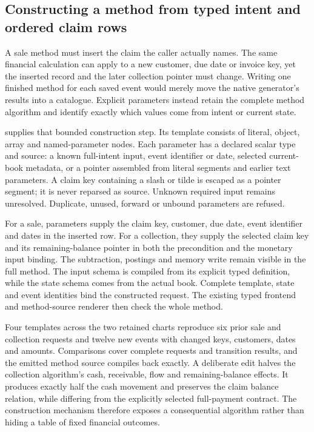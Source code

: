 \subsection{Constructing a method from typed intent and ordered claim rows}
\label{sec:method-specialization}

A sale method must insert the claim the caller actually names. The same
financial calculation can apply to a new customer, due date or invoice key,
yet the inserted record and the later collection pointer must change. Writing
one finished method for each saved event would merely move the native
generator's results into a catalogue. Explicit parameters instead retain the
complete method algorithm and identify exactly which values come from intent
or current state.

 supplies that bounded construction step.
Its template consists of literal, object, array and named-parameter nodes.
Each parameter has a declared scalar type and source: a known full-intent input,
event identifier or date, selected current-book metadata, or a pointer assembled
from literal segments and earlier text parameters. A claim key containing a
slash or tilde is escaped as a pointer segment; it is never reparsed as source.
Unknown required input remains unresolved. Duplicate, unused, forward or
unbound parameters are refused.

For a sale, parameters supply the claim key, customer, due date, event identifier
and dates in the inserted row. For a collection, they supply the selected
claim key and its remaining-balance pointer in both the precondition and the
monetary input binding. The subtraction, postings and memory write remain
visible in the full method. The input schema is compiled from its explicit
typed definition, while the state schema comes from the actual book. Complete
template, state and event identities bind the constructed request. The existing
typed frontend and method-source renderer then check the whole method.

Four templates across the two retained charts reproduce six prior sale and
collection requests and twelve new events with changed keys, customers, dates
and amounts. Comparisons cover complete requests and transition results, and
the emitted method source compiles back exactly. A deliberate edit halves the
collection algorithm's cash, receivable, flow and remaining-balance effects.
It produces exactly half the cash movement and preserves the claim balance
relation, while differing from the explicitly selected full-payment contract.
The construction mechanism therefore exposes a consequential algorithm rather
than hiding a table of fixed financial outcomes.

